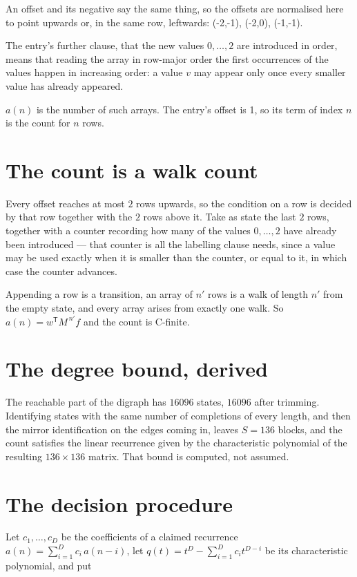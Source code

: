 \documentclass[11pt]{article}
\theoremstyle{definition}
\begin{document}
An offset and its negative say the same thing, so the offsets are normalised here to point upwards or, in the same row, leftwards: (-2,-1), (-2,0), (-1,-1).

The entry's further clause, that the new values $0,\dots,2$ are introduced in order, means that reading the array in row-major order the first occurrences of the values happen in increasing order: a value $v$ may appear only once every smaller value has already appeared.

$a(n)$ is the number of such arrays. The entry's offset is 1, so its term of index $n$ is the count for $n$ rows.

\section{The count is a walk count}

Every offset reaches at most $2$ rows upwards, so the condition on a row is decided by that row together with the $2$ rows above it. Take as state the last $2$ rows, together with a counter recording how many of the values $0,\dots,2$ have already been introduced --- that counter is all the labelling clause needs, since a value may be used exactly when it is smaller than the counter, or equal to it, in which case the counter advances.

Appending a row is a transition, an array of $n'$ rows is a walk of length $n'$ from the empty state, and every array arises from exactly one walk. So $a(n) = w^{\mathsf T}M^{\,n'}f$ and the count is C-finite.

\section{The degree bound, derived}

The reachable part of the digraph has $16096$ states, $16096$ after trimming. Identifying states with the same number of completions of every length, and then the mirror identification on the edges coming in, leaves $S = 136$ blocks, and the count satisfies the linear recurrence given by the characteristic polynomial of the resulting $136\times136$ matrix. That bound is computed, not assumed.

\section{The decision procedure}

Let $c_1,\dots,c_D$ be the coefficients of a claimed recurrence $a(n) = \sum_{i=1}^{D} c_i\,a(n-i)$, let $q(t) = t^{D} - \sum_{i=1}^{D} c_i t^{D-i}$ be its characteristic polynomial, and put
\end{document}

